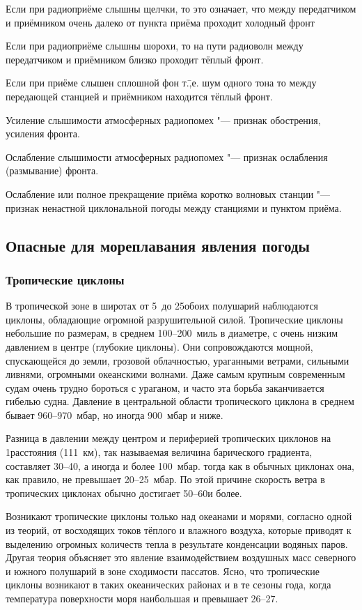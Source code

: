  Если при радиоприёме слышны щелчки, то это означает, что между
передатчиком и приёмником очень далеко от пункта приёма проходит
холодный фронт

 Если при радиоприёме слышны шорохи, то на пути радиоволн между
передатчиком и приёмником близко проходит тёплый фронт.

 Если при приёме слышен сплошной фон т.\=,е. шум одного тона то
между передающей станцией и приёмником находится тёплый фронт.

 Усиление слышимости атмосферных радиопомех "--- признак
обострения, усиления фронта.

 Ослабление слышимости атмосферных радиопомех "--- признак
ослабления (размывание) фронта.

 Ослабление или полное прекращение приёма коротко волновых
станции "--- признак ненастной циклональной погоды между станциями и
пунктом приёма.

\subsection{Опасные для мореплавания явления погоды}

\subsubsection{Тропические циклоны}

В тропической зоне в широтах от 5~до 25\gr обоих полушарий наблюдаются
циклоны, обладающие огромной разрушительной силой. Тропические циклоны
небольшие по размерам, в среднем 100--200~миль в диаметре, с очень
низким давлением в центре (глубокие циклоны). Они сопровождаются
мощной, спускающейся до земли, грозовой облачностью, ураганными
ветрами, сильными ливнями, огромными океанскими волнами. Даже самым
крупным современным судам очень трудно бороться с ураганом, и часто
эта борьба заканчивается гибелью судна. Давление в центральной области
тропического циклона в среднем бывает 960--970~мбар, но иногда 900~мбар
и ниже.

Разница в давлении между центром и периферией тропических циклонов на
1\gr расстояния (111~км), так называемая величина барического градиента,
составляет 30--40, а иногда и более 100~мбар. тогда как в обычных
циклонах она, как правило, не превышает 20--25~мбар. По этой причине
скорость ветра в тропических циклонах обычно достигает 50--60\speedms и
более.

Возникают тропические циклоны только над океанами и морями, согласно
одной из теорий, от восходящих токов тёплого и влажного воздуха,
которые приводят к выделению огромных количеств тепла в результате
конденсации водяных паров. Другая теория объясняет это явление
взаимодействием воздушных масс северного и южного полушарий в зоне
сходимости пассатов. Ясно, что тропические циклоны возникают в таких
океанических районах и в те сезоны года, когда температура поверхности
моря наибольшая и превышает 26--27\grC.

